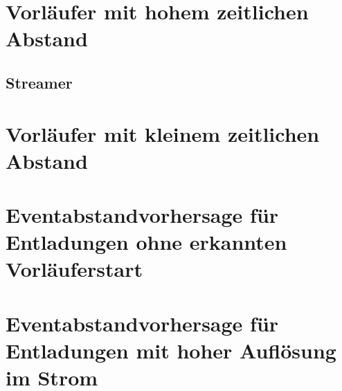 \section{Vorläufer mit hohem zeitlichen Abstand}
\label{sec:precursor_long}

\subsection{Streamer}

\section{Vorläufer mit kleinem zeitlichen Abstand}
\label{sec:precursor_short}

\section{Eventabstandvorhersage für Entladungen ohne erkannten Vorläuferstart}

\section{Eventabstandvorhersage für Entladungen mit hoher Auflösung im Strom}

